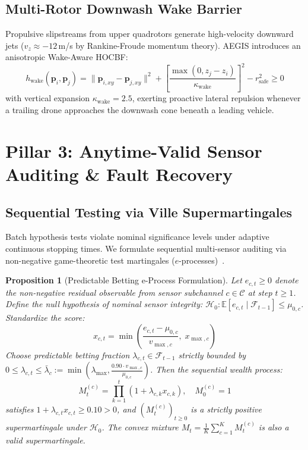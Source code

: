 \documentclass[journal,10pt]{IEEEtran}
\newtheorem{proposition}{Proposition}
\begin{document}
\subsection{Multi-Rotor Downwash Wake Barrier}
Propulsive slipstreams from upper quadrotors generate high-velocity downward jets ($v_z \approx -12\,$m/s by Rankine-Froude momentum theory). AEGIS introduces an anisotropic Wake-Aware HOCBF:
\begin{equation}
h_{\text{wake}}(\mathbf{p}_i, \mathbf{p}_j) = \|\mathbf{p}_{i,xy} - \mathbf{p}_{j,xy}\|^2 + \left[\frac{\max(0, z_j - z_i)}{\kappa_{\text{wake}}}\right]^2 - r_{\text{safe}}^2 \ge 0
\end{equation}
with vertical expansion $\kappa_{\text{wake}} = 2.5$, exerting proactive lateral repulsion whenever a trailing drone approaches the downwash cone beneath a leading vehicle.

\section{Pillar 3: Anytime-Valid Sensor Auditing \& Fault Recovery}
\label{sec:pillar3_auditing}

\subsection{Sequential Testing via Ville Supermartingales}
Batch hypothesis tests violate nominal significance levels under adaptive continuous stopping times. We formulate sequential multi-sensor auditing via non-negative game-theoretic test martingales ($e$-processes)~\cite{ville1939etude, ramdas2023game, vovk2021values}.

\begin{proposition}[Predictable Betting e-Process Formulation]
\label{prop:ville}
Let $e_{c,t} \ge 0$ denote the non-negative residual observable from sensor subchannel $c \in \mathcal{C}$ at step $t \ge 1$. Define the null hypothesis of nominal sensor integrity: $\mathcal{H}_{0}: \mathbb{E}[e_{c,t} \mid \mathcal{F}_{t-1}] \le \mu_{0,c}$. Standardize the score:
\begin{equation}
x_{c,t} = \min\left( \frac{e_{c,t} - \mu_{0,c}}{v_{\max,c}}, \; x_{\max,c} \right)
\end{equation}
Choose predictable betting fraction $\lambda_{c,t} \in \mathcal{F}_{t-1}$ strictly bounded by $0 \le \lambda_{c,t} \le \bar{\lambda}_c := \min(\lambda_{\max}, \frac{0.90 \cdot v_{\max,c}}{\mu_{0,c}})$. Then the sequential wealth process:
\begin{equation}
M_t^{(c)} = \prod_{k=1}^t (1 + \lambda_{c,k} x_{c,k}), \quad M_0^{(c)} = 1
\end{equation}
satisfies $1 + \lambda_{c,t} x_{c,t} \ge 0.10 > 0$, and $(M_t^{(c)})_{t \ge 0}$ is a strictly positive supermartingale under $\mathcal{H}_0$. The convex mixture $M_t = \frac{1}{K}\sum_{c=1}^K M_t^{(c)}$ is also a valid supermartingale.
\end{proposition}
\end{document}
